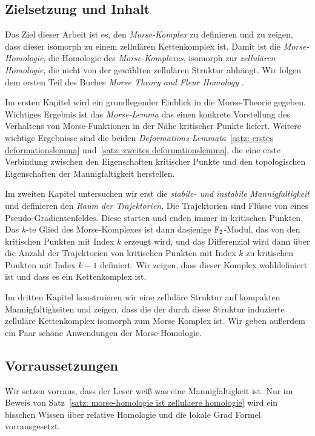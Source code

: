 \documentclass[a4paper,11pt,twoside]{scrreport}
\begin{document}
\subsection*{Zielsetzung und Inhalt}

Das Ziel dieser Arbeit ist es, den \textit{Morse-Komplex} zu definieren und zu zeigen, dass dieser 
isomorph zu einem zellulären Kettenkomplex ist. Damit ist die \textit{Morse-Homologie}, die Homologie des 
\textit{Morse-Komplexes}, isomorph zur \textit{zellulären Homologie}, die nicht von der gewählten 
zellulären Struktur abhängt. Wir folgen dem ersten Teil des Buches 
\textit{Morse Theory and Fleur Homology} \cite{audin}. 

Im ersten Kapitel wird ein grundlegender Einblick in die Morse-Theorie gegeben. Wichtiges Ergebnis ist
das \textit{Morse-Lemma} das einen konkrete Vorstellung des Verhaltens von Morse-Funktionen in der Nähe 
kritischer Punkte liefert. Weitere wichtige Ergebnisse sind die beiden 
\textit{Deformations-Lemmata}~\ref{satz: erstes deformationslemma} und~\ref{satz: zweites deformationslemma},
die eine erste Verbindung zwischen den Eigenschaften kritischer Punkte und den topologischen Eigenschaften
der Mannigfaltigkeit herstellen.

Im zweiten Kapitel untersuchen wir erst die \textit{stabile- und instabile Mannigfaltigkeit} und 
definieren den \textit{Raum der Trajektorien}, Die Trajektorien sind Flüsse von eines Pseudo-Gradientenfeldes.
Diese starten und enden immer in kritischen Punkten. Das $k$-te Glied des Morse-Komplexes ist dann dasjenige
${ \mathbb F }_2$-Modul, das von den kritischen Punkten mit Index $k$ erzeugt wird, und das Differenzial wird dann über
die Anzahl der Trajektorien von kritischen Punkten mit Index $k$ zu kritischen Punkten mit Index 
$k - 1$ definiert. Wir zeigen, dass dieser Komplex wohldefiniert ist und dass es ein Kettenkomplex ist. 

Im dritten Kapitel konstruieren wir eine zelluläre Struktur auf kompakten Mannigfaltigkeiten und zeigen,
dass die der durch diese Struktur induzierte zelluläre Kettenkomplex isomorph zum Morse Komplex ist. 
Wir geben außerdem ein Paar schöne Anwendungen der Morse-Homologie.

\subsection*{Vorraussetzungen}

Wir setzen vorraus, dass der Leser weiß was eine Mannigfaltigkeit ist. Nur im Beweis von 
Satz~\ref{satz: morse-homologie ist zellulaere homologie} wird ein bisschen Wissen über relative Homologie
und die lokale Grad Formel vorrausgesetzt. 
\end{document}
